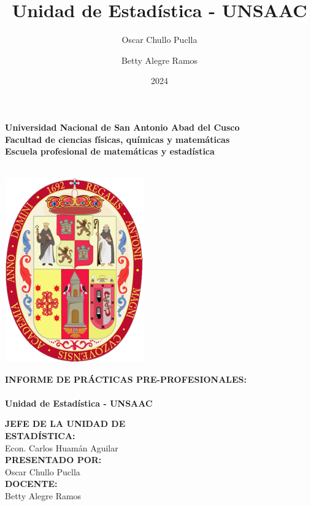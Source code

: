 \documentclass[
  12pt,
  letterpaper,
]{scrreprt}
\title{Unidad de Estadística - UNSAAC}
\author{Oscar Chullo Puclla \and Betty Alegre Ramos}
\date{2024}
\begin{document}
\thispagestyle{empty}
\hspace{0.075\textwidth} 
\begin{minipage}[b][\textheight][s]{0.85\textwidth}

\centering
\textbf{\large{Universidad Nacional de San Antonio Abad del Cusco}} \\
\textbf{\large{Facultad de ciencias físicas, químicas y matemáticas}} \\
\textbf{\large{Escuela profesional de matemáticas y estadística}} \\
\textbf{\large{}} \\ %
\vspace{1\baselineskip}

\includegraphics[width=6cm]{imagen/unsaac.png}
\vspace{1\baselineskip}

\Large{\textbf{INFORME DE PRÁCTICAS PRE-PROFESIONALES:}} \\
\hrulefill \\
{\Large\bfseries{Unidad de Estadística - UNSAAC}} \\
\hrulefill 



\large{
\flushleft \hspace{6cm}
\textbf{JEFE DE LA UNIDAD DE} \\\hspace{6cm}
\textbf{ESTADÍSTICA:} \\
\hspace{6cm} Econ. Carlos Huamán Aguilar \\ 
\smallskip
\hspace{6cm} \textbf{PRESENTADO POR:} \\ \hspace{6cm}
 {\large{Oscar Chullo Puclla}}
\\
\smallskip
\hspace{6cm} \textbf{DOCENTE:} \\ \hspace{6cm}
%
{\large{Betty Alegre Ramos}}%

}
\end{minipage}
\end{document}

